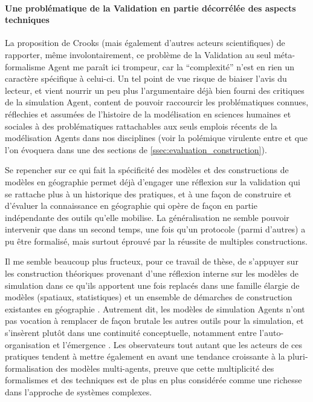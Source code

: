 \paragraph{Une problématique de la Validation en partie décorrélée des aspects techniques}
\label{decorreler_validation}

La proposition de Crooks (mais également d'autres acteurs scientifiques) de rapporter, même involontairement, ce problème de la Validation au seul méta-formalisme Agent me paraît ici trompeur, car la \enquote{complexité} n'est en rien un caractère spécifique à celui-ci. Un tel point de vue risque de biaiser l'avis du lecteur, et vient nourrir un peu plus l'argumentaire déjà bien fourni des critiques de la simulation Agent, content de pouvoir raccourcir les problématiques connues, réflechies et assumées de l'histoire de la modélisation en sciences humaines et sociales à des problématiques rattachables aux seuls emplois récents de la modélisation Agents dans nos disciplines (voir la polémique virulente entre \textcite{Yanoff2008} et \textcites{Elsenbroich2012,Chattoe2011} que l'on évoquera dans une des sections de \ref{ssec:evaluation_construction}).

Se repencher sur ce qui fait la spécificité des modèles et des constructions de modèles en géographie permet déjà d'engager une réflexion sur la validation qui se rattache plus à un historique des pratiques, et à une façon de construire et d'évaluer la connaissance en géographie qui opère de façon en partie indépendante des outils qu'elle mobilise. La généralisation ne semble pouvoir intervenir que dans un second temps, une fois qu'un protocole (parmi d'autres) a pu être formalisé, mais surtout éprouvé par la réussite de multiples constructions. %

Il me semble beaucoup plus fructeux, pour ce travail de thèse, de s'appuyer sur les construction théoriques provenant d'une réflexion interne sur les modèles de simulation dans ce qu'ils apportent une fois replacés dans une famille élargie de modèles (spatiaux, statistiques) et un ensemble de démarches de construction existantes en géographie \autocites{Geopoint2000, Mathian2014, Sanders2007}. Autrement dit, les modèles de simulation Agents n'ont pas vocation à remplacer de façon brutale les autres outils pour la simulation, et s'insèrent plutôt dans une continuité conceptuelle, notamment entre l'auto-organisation et l'émergence \autocites{Pumain2013}[851]{Sanders2013}. Les observateurs \autocites{Varenne2008b,Varenne2012a} tout autant que les acteurs \autocite{Sanders2013}  de ces pratiques tendent à mettre également en avant une tendance croissante à la pluri-formalisation des modèles multi-agents, preuve que cette multiplicité des formalismes et des techniques est de plus en plus considérée comme une richesse dans l'approche de systèmes complexes.

